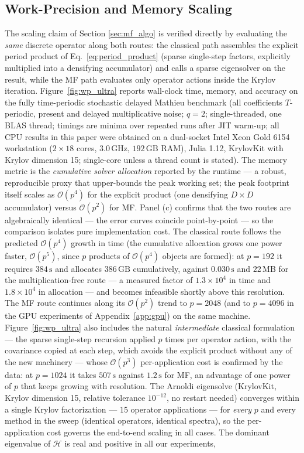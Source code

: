 \documentclass[preprint,12pt]{elsarticle}
\begin{document}
\subsection{Work-Precision and Memory Scaling}
The scaling claim of Section \ref{sec:mf_algo} is verified directly by evaluating the \emph{same} discrete operator along both routes: the classical path assembles the explicit period product of Eq.~\eqref{eq:period_product} (sparse single-step factors, explicitly multiplied into a densifying accumulator) and calls a sparse eigensolver on the result, while the MF path evaluates only operator actions inside the Krylov iteration. Figure~\ref{fig:wp_ultra} reports wall-clock time, memory, and accuracy on the fully time-periodic stochastic delayed Mathieu benchmark (all coefficients $T$-periodic, present and delayed multiplicative noise; $q=2$; single-threaded, one BLAS thread; timings are minima over repeated runs after JIT warm-up; all CPU results in this paper were obtained on a dual-socket Intel Xeon Gold 6154 workstation ($2\times18$ cores, $3.0\,\mathrm{GHz}$, $192\,\mathrm{GB}$ RAM), Julia 1.12, KrylovKit with Krylov dimension 15; single-core unless a thread count is stated). The memory metric is the \emph{cumulative solver allocation} reported by the runtime --- a robust, reproducible proxy that upper-bounds the peak working set; the peak footprint itself scales as $\mathcal{O}(p^4)$ for the explicit product (one densifying $D\times D$ accumulator) versus $\mathcal{O}(p^2)$ for MF. Panel (c) confirms that the two routes are algebraically identical --- the error curves coincide point-by-point --- so the comparison isolates pure implementation cost. The classical route follows the predicted $\mathcal{O}(p^4)$ growth in time (the cumulative allocation grows one power faster, $\mathcal{O}(p^5)$, since $p$ products of $\mathcal{O}(p^4)$ objects are formed): at $p = 192$ it requires $384\,\mathrm{s}$ and allocates $386\,\mathrm{GB}$ cumulatively, against $0.030\,\mathrm{s}$ and $22\,\mathrm{MB}$ for the multiplication-free route --- a measured factor of $1.3\times10^{4}$ in time and $1.8\times10^{4}$ in allocation --- and becomes infeasible shortly above this resolution. The MF route continues along its $\mathcal{O}(p^2)$ trend to $p = 2048$ (and to $p = 4096$ in the GPU experiments of Appendix~\ref{app:gpu}) on the same machine. Figure~\ref{fig:wp_ultra} also includes the natural \emph{intermediate} classical formulation --- the sparse single-step recursion applied $p$ times per operator action, with the covariance copied at each step, which avoids the explicit product without any of the new machinery --- whose $\mathcal{O}(p^3)$ per-application cost is confirmed by the data: at $p = 1024$ it takes $507\,\mathrm{s}$ against $1.2\,\mathrm{s}$ for MF, an advantage of one power of $p$ that keeps growing with resolution. The Arnoldi eigensolve (KrylovKit, Krylov dimension 15, relative tolerance $10^{-12}$, no restart needed) converges within a single Krylov factorization --- $15$ operator applications --- for \emph{every} $p$ and every method in the sweep (identical operators, identical spectra), so the per-application cost governs the end-to-end scaling in all cases. The dominant eigenvalue of $\mathcal{H}$ is real and positive in all our experiments, 
\end{document}
